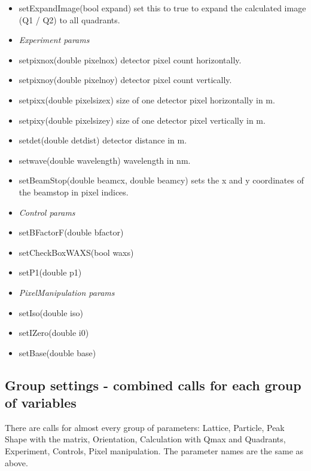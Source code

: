 \documentclass[11pt]{article} %
\begin{document}
\begin{itemize}
\item setExpandImage(bool expand) set this to true to expand the calculated image (Q1 / Q2) to all quadrants.
% 
\item[] {\it Experiment params}
\item setpixnox(double pixelnox) detector pixel count horizontally.
\item setpixnoy(double pixelnoy) detector pixel count vertically.
\item setpixx(double pixelsizex) size of one detector pixel horizontally in m.
\item setpixy(double pixelsizey) size of one detector pixel vertically in m.
\item setdet(double detdist) detector distance in m.
\item setwave(double wavelength) wavelength in nm.
\item setBeamStop(double beamcx, double beamcy) sets the x and y coordinates of the beamstop in pixel indices.
% 
\item[] {\it Control params}
\item setBFactorF(double bfactor)
\item setCheckBoxWAXS(bool waxs)
\item setP1(double p1)
% 
\item[] {\it PixelManipulation params}
\item setIso(double iso)
\item setIZero(double i0)
\item setBase(double base)
\end{itemize}


\subsection{Group settings - combined calls for each group of variables}

There are calls for almost every group of parameters: Lattice, Particle, Peak Shape with the matrix, Orientation, Calculation with Qmax and Quadrants, Experiment, Controls, Pixel manipulation. The parameter names are the same as above.
\end{document}
